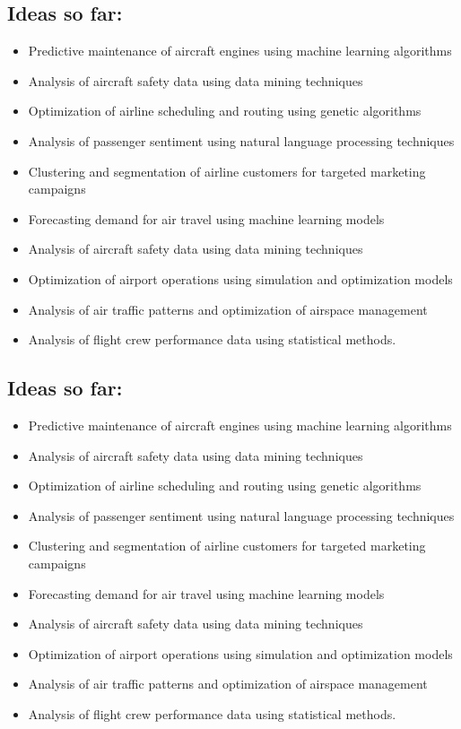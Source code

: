 \subsection{Ideas so far:}
\begin{itemize}
    \item Predictive maintenance of aircraft engines using machine learning algorithms
    \item Analysis of aircraft safety data using data mining techniques
    \item Optimization of airline scheduling and routing using genetic algorithms
    \item Analysis of passenger sentiment using natural language processing techniques
    \item Clustering and segmentation of airline customers for targeted marketing campaigns
    \item Forecasting demand for air travel using machine learning models
    \item Analysis of aircraft safety data using data mining techniques
    \item Optimization of airport operations using simulation and optimization models
    \item Analysis of air traffic patterns and optimization of airspace management
    \item Analysis of flight crew performance data using statistical methods.
\end{itemize}

\subsection{Ideas so far:}
\begin{itemize}
    \item Predictive maintenance of aircraft engines using machine learning algorithms
    \item Analysis of aircraft safety data using data mining techniques
    \item Optimization of airline scheduling and routing using genetic algorithms
    \item Analysis of passenger sentiment using natural language processing techniques
    \item Clustering and segmentation of airline customers for targeted marketing campaigns
    \item Forecasting demand for air travel using machine learning models
    \item Analysis of aircraft safety data using data mining techniques
    \item Optimization of airport operations using simulation and optimization models
    \item Analysis of air traffic patterns and optimization of airspace management
    \item Analysis of flight crew performance data using statistical methods.
\end{itemize}